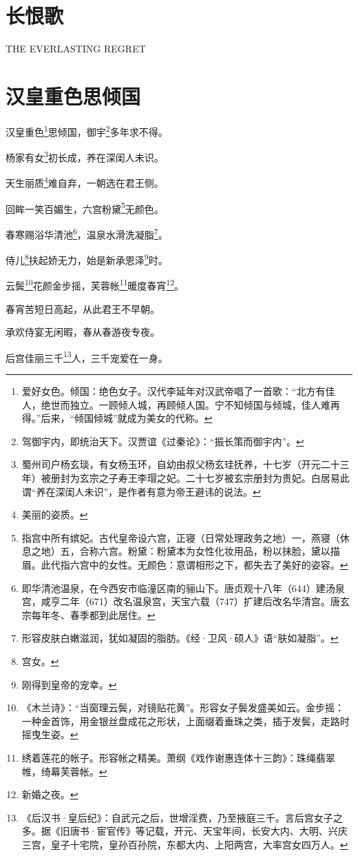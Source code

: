 \documentclass{article}
\begin{document}
\tableofcontents

\newpage

\section*{长恨歌}

THE EVERLASTING REGRET

\section{汉皇重色思倾国}

汉皇重色\footnote{爱好女色。倾国：绝色女子。汉代李延年对汉武帝唱了一首歌：“北方有佳人，绝世而独立。一顾倾人城，再顾倾人国。宁不知倾国与倾城，佳人难再得。”后来，“倾国倾城”就成为美女的代称。}思倾国，御宇\footnote{驾御宇内，即统治天下。汉贾谊《过秦论》：“振长策而御宇内”。}多年求不得。

杨家有女\footnote{蜀州司户杨玄琰，有女杨玉环，自幼由叔父杨玄珪抚养，十七岁（开元二十三年）被册封为玄宗之子寿王李瑁之妃。二十七岁被玄宗册封为贵妃。白居易此谓“养在深闺人未识”，是作者有意为帝王避讳的说法。}初长成，养在深闺人未识。

天生丽质\footnote{美丽的姿质。}难自弃，一朝选在君王侧。

回眸一笑百媚生，六宫粉黛\footnote{指宫中所有嫔妃。古代皇帝设六宫，正寝（日常处理政务之地）一，燕寝（休息之地）五，合称六宫。粉黛：粉黛本为女性化妆用品，粉以抹脸，黛以描眉。此代指六宫中的女性。无颜色：意谓相形之下，都失去了美好的姿容。}无颜色。

春寒赐浴华清池\footnote{即华清池温泉，在今西安市临潼区南的骊山下。唐贞观十八年（644）建汤泉宫，咸亨二年（671）改名温泉宫，天宝六载（747）扩建后改名华清宫。唐玄宗每年冬、春季都到此居住。}，温泉水滑洗凝脂\footnote{形容皮肤白嫩滋润，犹如凝固的脂肪。《经·卫风·硕人》语“肤如凝脂”。}。

侍儿\footnote{宫女。}扶起娇无力，始是新承恩泽\footnote{刚得到皇帝的宠幸。}时。

云鬓\footnote{《木兰诗》：“当窗理云鬓，对镜贴花黄”。形容女子鬓发盛美如云。金步摇：一种金首饰，用金银丝盘成花之形状，上面缀着垂珠之类，插于发鬓，走路时摇曳生姿。}花颜金步摇，芙蓉帐\footnote{绣着莲花的帐子。形容帐之精美。萧纲《戏作谢惠连体十三韵》：珠绳翡翠帷，绮幕芙蓉帐。}暖度春宵\footnote{新婚之夜。}。

春宵苦短日高起，从此君王不早朝。

承欢侍宴无闲暇，春从春游夜专夜。

后宫佳丽三千\footnote{《后汉书·皇后纪》：自武元之后，世增淫费，乃至掖庭三千。言后宫女子之多。据《旧唐书·宦官传》等记载，开元、天宝年间，长安大内、大明、兴庆三宫，皇子十宅院，皇孙百孙院，东都大内、上阳两宫，大率宫女四万人。}人，三千宠爱在一身。
\end{document}
